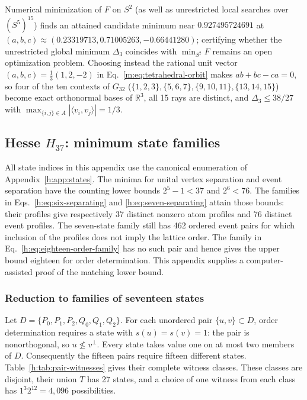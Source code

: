 \documentclass[aps,pra,reprint,superscriptaddress,longbibliography,nofootinbib,floatfix,10pt]{revtex4-2}
\theoremstyle{definition}
\newcommand{\R}{\mathbb{R}}
\begin{document}
Numerical minimization of $F$ on $S^2$ (as well as unrestricted local searches
over $(S^5)^{15}$) finds an attained candidate minimum near
$0.927495724691$ at $(a,b,c)\approx(0.23319713,0.71005263,-0.66441280)$;
certifying whether the unrestricted global minimum $\Delta_3$ coincides with
$\min_{S^2}F$ remains an open optimization problem. Choosing instead the rational
unit vector $(a,b,c)=\frac{1}{3}(1,2,-2)$ in Eq.~\eqref{m:eq:tetrahedral-orbit}
makes $ab+bc-ca=0$, so four of the ten contexts of $G_{32}$
($\{1,2,3\},\{5,6,7\},\{9,10,11\},\{13,14,15\}$) become exact orthonormal bases
of $\R^3$, all 15 rays are distinct, and $\Delta_3\le 38/27$ with
$\max_{\{i,j\}\in A}|\langle v_i,v_j\rangle|=1/3$.

\subsection{\texorpdfstring{Hesse $H_{37}$: minimum state families}{Hesse H37: minimum state families}}
\label{h:app:minimal-families}

All state indices in this appendix use the canonical enumeration of Appendix~\ref{h:app:states}. The minima for unital vertex separation and event separation have the counting lower bounds $2^5-1<37$ and $2^6<76$. The families in Eqs.~\eqref{h:eq:six-separating} and \eqref{h:eq:seven-separating} attain those bounds: their profiles give respectively 37 distinct nonzero atom profiles and 76 distinct event profiles. The seven-state family still has 462 ordered event pairs for which inclusion of the profiles does not imply the lattice order. The family in Eq.~\eqref{h:eq:eighteen-order-family} has no such pair and hence gives the upper bound eighteen for order determination. This appendix supplies a computer-assisted proof of the matching lower bound.

\subsubsection{Reduction to families of seventeen states}

Let $D=\{P_0,P_1,P_2,Q_0,Q_1,Q_2\}$. For each unordered pair $\{u,v\}\subset D$, order determination requires a state with $s(u)=s(v)=1$: the pair is nonorthogonal, so $u\not\le v^\perp$. Every state takes value one on at most two members of $D$. Consequently the fifteen pairs require fifteen different states. Table~\ref{h:tab:pair-witnesses} gives their complete witness classes. These classes are disjoint, their union $T$ has 27 states, and a choice of one witness from each class has $1^3 2^{12}=4{,}096$ possibilities.
\end{document}
